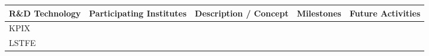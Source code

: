 \begin{landscape}
\begin{table}[h]
    \centering
    \begin{adjustbox}{max width=1\textwidth}
\begin{tabularx}{2\textwidth}{lXXXX}
    \toprule
    R\&D Technology & Participating Institutes & Description / Concept & Milestones & Future Activities \\
    \midrule
        KPIX &
        &
        &
        & \\
    \midrule
    LSTFE &
    &
    &
    & \\
    \bottomrule
\end{tabularx}
\end{adjustbox}

\end{table}
\end{landscape}
\restoregeometry
